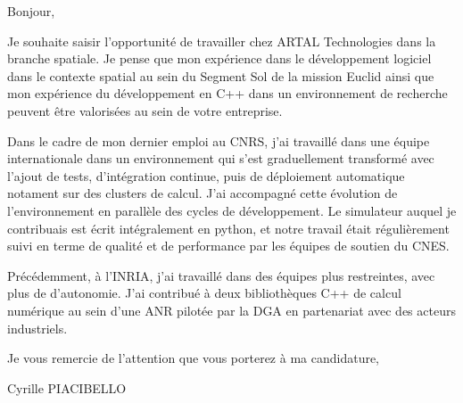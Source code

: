 \documentclass{article}
\begin{document}
Bonjour,

Je souhaite saisir l'opportunité de travailler chez ARTAL Technologies
dans la branche spatiale. Je pense que mon expérience dans le
développement logiciel dans le contexte spatial au sein du Segment Sol
de la mission Euclid ainsi que mon expérience du développement en C++
dans un environnement de recherche peuvent être valorisées au sein de
votre entreprise.

Dans le cadre de mon dernier emploi au CNRS, j'ai travaillé dans une
équipe internationale dans un environnement qui s'est graduellement
transformé avec l'ajout de tests, d'intégration continue, puis de
déploiement automatique notament sur des clusters de calcul. J'ai
accompagné cette évolution de l'environnement en parallèle des cycles
de développement. Le simulateur auquel je contribuais est écrit
intégralement en python, et notre travail était régulièrement suivi en
terme de qualité et de performance par les équipes de soutien du CNES.

Précédemment, à l'INRIA, j'ai travaillé dans des équipes plus
restreintes, avec plus de d'autonomie. J'ai contribué à deux
bibliothèques C++ de calcul numérique au sein d'une ANR pilotée par la
DGA en partenariat avec des acteurs industriels.




\bigskip %

Je vous remercie de l'attention que vous porterez à ma candidature,

\vspace{50pt} %

Cyrille PIACIBELLO
\end{document}
